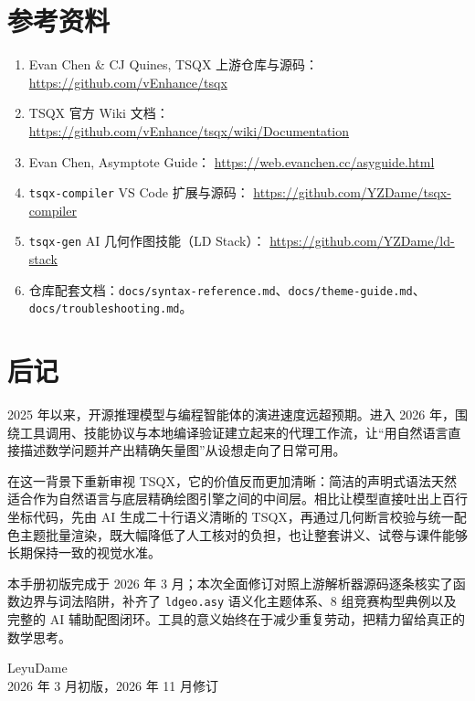 \documentclass[11pt,oneside,fontset=none]{ctexbook}
\newcommand{\code}[1]{\texttt{#1}}
\begin{document}
\backmatter
\chapter*{参考资料}
\small
\begin{enumerate}
  \item Evan Chen \& CJ Quines, TSQX 上游仓库与源码：
        \url{https://github.com/vEnhance/tsqx}
  \item TSQX 官方 Wiki 文档：
        \url{https://github.com/vEnhance/tsqx/wiki/Documentation}
  \item Evan Chen, Asymptote Guide：
        \url{https://web.evanchen.cc/asyguide.html}
  \item \code{tsqx-compiler} VS Code 扩展与源码：
        \url{https://github.com/YZDame/tsqx-compiler}
  \item \code{tsqx-gen} AI 几何作图技能（LD Stack）：
        \url{https://github.com/YZDame/ld-stack}
  \item 仓库配套文档：\code{docs/syntax-reference.md}、\code{docs/theme-guide.md}、\code{docs/troubleshooting.md}。
\end{enumerate}

\normalsize
\chapter*{后记}
2025 年以来，开源推理模型与编程智能体的演进速度远超预期。进入 2026 年，围绕工具调用、技能协议与本地编译验证建立起来的代理工作流，让“用自然语言直接描述数学问题并产出精确矢量图”从设想走向了日常可用。

在这一背景下重新审视 TSQX，它的价值反而更加清晰：简洁的声明式语法天然适合作为自然语言与底层精确绘图引擎之间的中间层。相比让模型直接吐出上百行坐标代码，先由 AI 生成二十行语义清晰的 TSQX，再通过几何断言校验与统一配色主题批量渲染，既大幅降低了人工核对的负担，也让整套讲义、试卷与课件能够长期保持一致的视觉水准。

本手册初版完成于 2026 年 3 月；本次全面修订对照上游解析器源码逐条核实了函数边界与词法陷阱，补齐了 \code{ldgeo.asy} 语义化主题体系、8 组竞赛构型典例以及完整的 AI 辅助配图闭环。工具的意义始终在于减少重复劳动，把精力留给真正的数学思考。

\bigskip
\begin{flushright}
  LeyuDame\\
  2026 年 3 月初版，2026 年 11 月修订
\end{flushright}
\end{document}
